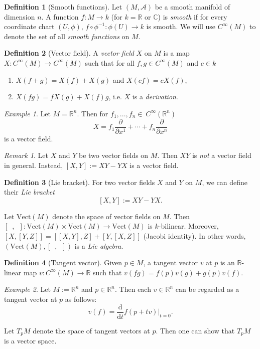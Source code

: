 \documentclass[12pt]{amsart}
\numberwithin{equation}{section}
\theoremstyle{plain}
\theoremstyle{definition}
\newtheorem{defn}{Definition}[subsection]
\theoremstyle{remark}
\newtheorem{rem}{Remark}[subsection]
\newtheorem{ex}{Example}[subsection]
\newcommand{\R}{\mathbb{R}}
\newcommand{\dd}{{\mathrm{d}}}
\newcommand{\calA}{\mathcal{A}}
\begin{document}
\begin{defn}[Smooth functions]
Let $(M,\calA)$ be a smooth manifold of dimension $n$. A function $f\colon M\to k$ (for $k=\R$ or $\mathbb{C}$) is \emph{smooth} if for every coordinate chart $(U,\phi)$, $f\circ \phi^{-1}\colon \phi(U)\to k$ is smooth. We will use $C^\infty(M)$ to denote the set of all \emph{smooth functions} on $M$.
\end{defn}

\begin{defn}[Vector field]
A \emph{vector field} $X$ on $M$ is a map $X\colon C^\infty(M)\to C^{\infty}(M)$ such that for all $f,g\in C^\infty(M)$ and $c\in k$
\begin{enumerate}
\item{$X(f+g)=X(f)+X(g)$ and $X(cf)=cX(f)$,
}
\item{$X(fg)=fX(g)+X(f)g$, i.e. $X$ is a \emph{derivation}.
}
\end{enumerate}
\end{defn}

\begin{ex}
Let $M=\R^n$. Then for $f_1,...,f_n\in\ C^\infty(\R^n)$
$$X=f_1\frac{\partial}{\partial x^1}+\dotsm +f_n\frac{\partial}{\partial x^n}$$
is a vector field.
\end{ex}

\begin{rem}
Let $X$ and $Y$ be two vector fields on $M$. Then $XY$ is \emph{not} a vector field in general. Instead, $[X,Y]:=XY-YX$ is a vector field.
\end{rem}

\begin{defn}[Lie bracket]
For two vector fields $X$ and $Y$ on $M$, we can define their \emph{Lie bracket}
$$[X,Y]:=XY-YX.$$
\end{defn}

Let $\mathrm{Vect}(M)$ denote the space of vector fields on $M$. Then $[\enspace,\enspace]\colon \mathrm{Vect}(M)\times \mathrm{Vect}(M)\to \mathrm{Vect}(M)$ is $k$-bilinear. Moreover, $[X,[Y,Z]]=[[X,Y],Z]+[Y,[X,Z]]$ (Jacobi identity). In other words, $(\mathrm{Vect}(M),[\enspace,\enspace])$ is a \emph{Lie algebra}. 

\begin{defn}[Tangent vector]
Given $p\in M$, a tangent vector $v$ at $p$ is an $\R$-linear map $v\colon C^\infty(M)\to\R$ such that $v(fg)=f(p)v(g)+g(p)v(f)$.
\end{defn}

\begin{ex}
Let $M:=\R^n$ and $p\in\R^n$. Then each $v\in\R^n$ can be regarded as a tangent vector at $p$ as follows: 
$$v(f)=\frac{\dd}{\dd t}f(p+tv)\bigg|_{t=0}.$$
\end{ex}
Let $T_pM$ denote the space of tangent vectors at $p$. Then one can show that $T_pM$ is a vector space.
\end{document}

